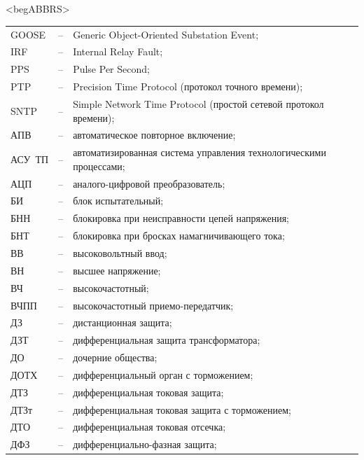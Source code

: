 \color{unimain}\section*{}
{\color{white}\fontsize{0.1pt}{0.1pt}\selectfont<begABBRS>}
\color{black}
\begin{longtable}{>{\raggedright\arraybackslash}m{2cm}>{\raggedright\arraybackslash}m{0.5cm}>{\raggedright\arraybackslash}m{20cm}}
\endfirsthead\endhead\endfoot\endlastfoot
GOOSE & -- & Generic Object-Oriented Substation Event; \\
IRF & -- & Internal Relay Fault; \\
PPS & -- & Pulse Per Second; \\
PTP & -- & Precision Time Protocol (протокол точного времени); \\
SNTP & -- & Simple Network Time Protocol (простой сетевой протокол времени); \\
АПВ & -- & автоматическое повторное включение; \\
АСУ~ТП & -- & автоматизированная система управления технологическими процессами; \\
АЦП & -- & аналого-цифровой преобразователь; \\
БИ & -- & блок испытательный; \\
БНН & -- & блокировка при неисправности цепей напряжения; \\
БНТ & -- & блокировка при бросках намагничивающего тока; \\
ВВ & -- & высоковольтный ввод; \\
ВН & -- & высшее напряжение; \\
ВЧ & -- & высокочастотный; \\
ВЧПП & -- & высокочастотный приемо-передатчик; \\
ДЗ & -- & дистанционная защита; \\
ДЗТ & -- & дифференциальная защита трансформатора; \\
ДО & -- & дочерние общества; \\
ДОТХ & -- & дифференциальный орган с торможением; \\
ДТЗ & -- & дифференциальная токовая защита; \\
ДТЗт & -- & дифференциальная токовая защита с торможением; \\
ДТО & -- & дифференциальная токовая отсечка; \\
ДФЗ & -- & дифференциально-фазная защита; \\

\end{longtable}
